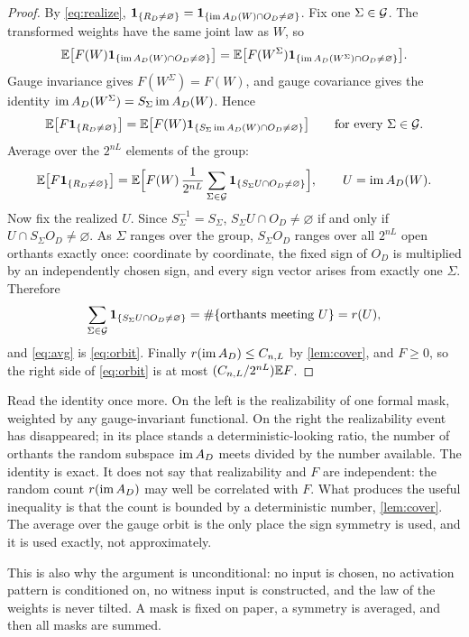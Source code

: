\begin{proof}
By \cref{eq:realize}, $\mathbf{1}_{\{R_D\ne\varnothing\}}=\mathbf{1}_{\{\operatorname{im} A_D(W)\cap O_D\ne\varnothing\}}$. Fix one $\Sigma\in\mathcal{G}$. The transformed weights have the same joint law as $W$, so
\[
\mathbb{E}\bigl[F(W)\mathbf{1}_{\{\operatorname{im} A_D(W)\cap O_D\ne\varnothing\}}\bigr]=\mathbb{E}\bigl[F(W^\Sigma)\mathbf{1}_{\{\operatorname{im} A_D(W^\Sigma)\cap O_D\ne\varnothing\}}\bigr].
\]
Gauge invariance gives $F(W^\Sigma)=F(W)$, and gauge covariance gives the identity $\operatorname{im} A_D(W^\Sigma)=S_\Sigma\operatorname{im} A_D(W)$. Hence
\[
\mathbb{E}\bigl[F\mathbf{1}_{\{R_D\ne\varnothing\}}\bigr]=\mathbb{E}\bigl[F(W)\mathbf{1}_{\{S_\Sigma\operatorname{im} A_D(W)\cap O_D\ne\varnothing\}}\bigr]\qquad\text{for every }\Sigma\in\mathcal{G} .
\]
Average over the $2^{nL}$ elements of the group:
\begin{equation}\label{eq:avg}
\mathbb{E}\bigl[F\mathbf{1}_{\{R_D\ne\varnothing\}}\bigr]=\mathbb{E}\Bigl[F(W)\,\frac{1}{2^{nL}}\sum_{\Sigma\in\mathcal{G}}\mathbf{1}_{\{S_\Sigma U\cap O_D\ne\varnothing\}}\Bigr],\qquad U=\operatorname{im} A_D(W).
\end{equation}
Now fix the realized $U$. Since $S_\Sigma^{-1}=S_\Sigma$, $S_\Sigma U\cap O_D\ne\varnothing$ if and only if $U\cap S_\Sigma O_D\ne\varnothing$. As $\Sigma$ ranges over the group, $S_\Sigma O_D$ ranges over all $2^{nL}$ open orthants exactly once: coordinate by coordinate, the fixed sign of $O_D$ is multiplied by an independently chosen sign, and every sign vector arises from exactly one $\Sigma$. Therefore
\[
\sum_{\Sigma\in\mathcal{G}}\mathbf{1}_{\{S_\Sigma U\cap O_D\ne\varnothing\}}=\#\{\text{orthants meeting }U\}=r(U),
\]
and \cref{eq:avg} is \cref{eq:orbit}. Finally $r(\operatorname{im} A_D)\le C_{n,L}$ by \cref{lem:cover}, and $F\ge 0$, so the right side of \cref{eq:orbit} is at most $(C_{n,L}/2^{nL})\mathbb{E} F$.
\end{proof}

Read the identity once more. On the left is the realizability of one formal mask, weighted by any gauge-invariant functional. On the right the realizability event has disappeared; in its place stands a deterministic-looking ratio, the number of orthants the random subspace $\operatorname{im} A_D$ meets divided by the number available. The identity is exact. It does not say that realizability and $F$ are independent: the random count $r(\operatorname{im} A_D)$ may well be correlated with $F$. What produces the useful inequality is that the count is bounded by a deterministic number, \cref{lem:cover}. The average over the gauge orbit is the only place the sign symmetry is used, and it is used exactly, not approximately.

This is also why the argument is unconditional: no input is chosen, no activation pattern is conditioned on, no witness input is constructed, and the law of the weights is never tilted. A mask is fixed on paper, a symmetry is averaged, and then all masks are summed.

